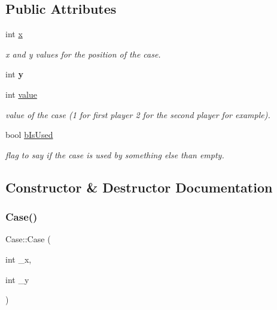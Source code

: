 \subsection*{Public Attributes}
\begin{DoxyCompactItemize}
\item 
\mbox{\label{class_case_a6adfd5aa9d5888fbaa6b193f1211c254}} 
int \hyperlink{class_case_a6adfd5aa9d5888fbaa6b193f1211c254}{x}
\begin{DoxyCompactList}\small\item\em x and y values for the position of the case. \end{DoxyCompactList}\item 
\mbox{\label{class_case_a1cef8e765dd4a9eb3426f5608a3ef3d6}} 
int {\bfseries y}
\item 
\mbox{\label{class_case_a669775ca1dcd9f6908f4df4f3f4554f2}} 
int \hyperlink{class_case_a669775ca1dcd9f6908f4df4f3f4554f2}{value}
\begin{DoxyCompactList}\small\item\em value of the case (1 for first player 2 for the second player for example). \end{DoxyCompactList}\item 
\mbox{\label{class_case_ad2a4ff001ec82079e53b9b70538c41f7}} 
bool \hyperlink{class_case_ad2a4ff001ec82079e53b9b70538c41f7}{b\+Is\+Used}
\begin{DoxyCompactList}\small\item\em flag to say if the case is used by something else than empty. \end{DoxyCompactList}\end{DoxyCompactItemize}


\subsection{Constructor \& Destructor Documentation}
\mbox{\label{class_case_aa0e4be50dd7f978fc2454222d0915203}} 
\subsubsection{\texorpdfstring{Case()}{Case()}}
{\footnotesize\ttfamily Case\+::\+Case (\begin{DoxyParamCaption}\item[{int}]{\+\_\+x,  }\item[{int}]{\+\_\+y }\end{DoxyParamCaption})\hspace{0.3cm}{\ttfamily [inline]}}




